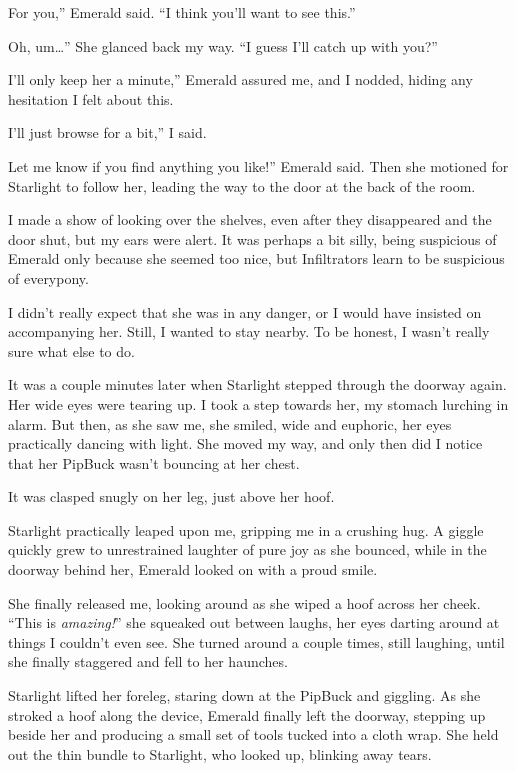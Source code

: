 \leavevmode{}For you,” Emerald said. “I think you’ll want to see this.”

\leavevmode{}Oh, um…” She glanced back my way. “I guess I’ll catch up with you?”

\leavevmode{}I’ll only keep her a minute,” Emerald assured me, and I nodded, hiding any hesitation I felt about this.

\leavevmode{}I’ll just browse for a bit,” I said.

\leavevmode{}Let me know if you find anything you like!” Emerald said. Then she motioned for Starlight to follow her, leading the way to the door at the back of the room.

I made a show of looking over the shelves, even after they disappeared and the door shut, but my ears were alert. It was perhaps a bit silly, being suspicious of Emerald only because she seemed too nice, but Infiltrators learn to be suspicious of everypony.

I didn’t really expect that she was in any danger, or I would have insisted on accompanying her. Still, I wanted to stay nearby. To be honest, I wasn’t really sure what else to do.

It was a couple minutes later when Starlight stepped through the doorway again. Her wide eyes were tearing up. I took a step towards her, my stomach lurching in alarm. But then, as she saw me, she smiled, wide and euphoric, her eyes practically dancing with light. She moved my way, and only then did I notice that her PipBuck wasn’t bouncing at her chest.

It was clasped snugly on her leg, just above her hoof.

Starlight practically leaped upon me, gripping me in a crushing hug. A giggle quickly grew to unrestrained laughter of pure joy as she bounced, while in the doorway behind her, Emerald looked on with a proud smile.

She finally released me, looking around as she wiped a hoof across her cheek. “This is \textit{amazing!}” she squeaked out between laughs, her eyes darting around at things I couldn’t even see. She turned around a couple times, still laughing, until she finally staggered and fell to her haunches.

Starlight lifted her foreleg, staring down at the PipBuck and giggling. As she stroked a hoof along the device, Emerald finally left the doorway, stepping up beside her and producing a small set of tools tucked into a cloth wrap. She held out the thin bundle to Starlight, who looked up, blinking away tears.

